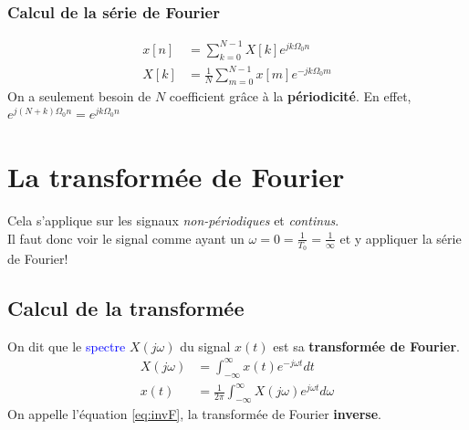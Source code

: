 \documentclass{report}
\begin{document}
\subsubsection{Calcul de la série de Fourier}
\begin{align}
x[n] &= \sum_{k=0}^{N-1} X[k] e^{jk\Omega_0n}\\
X[k] &= \frac{1}{N} \sum_{m=0}^{N-1} x[m] e^{-jk\Omega_0m}
\end{align}
On a seulement besoin de $N$ coefficient grâce à la \textbf{périodicité}. En effet, $e^{j(N+k)\Omega_0n} = e^{jk\Omega_0n}$



\section{La transformée de Fourier}
Cela s'applique sur les signaux \textit{non-périodiques} et \textit{continus}.\\
Il faut donc voir le signal comme ayant un $\omega = 0 = \frac{1}{T_0} = \frac{1}{\infty}$ et y appliquer la série de Fourier!

\subsection{Calcul de la transformée}
On dit que le \textcolor{blue}{spectre} $X(j\omega)$ du signal $x(t)$ est sa \textbf{transformée de Fourier}.
\begin{align}
X(j\omega) &= \int_{-\infty}^{\infty} x(t) e^{-j \omega t}dt\\
x(t) &= \frac{1}{2\pi} \int_{-\infty}^{\infty} X(j\omega) e^{j\omega t} d\omega \label{eq:invF}
\end{align}
On appelle l'équation \ref{eq:invF}, la transformée de Fourier \textbf{inverse}.\\
\end{document}
